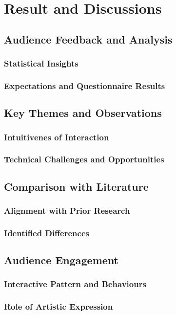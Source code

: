 \chapter{Result and Discussions}
    \section{Audience Feedback and Analysis}
        \subsection{Statistical Insights}
        \subsection{Expectations and Questionnaire Results}
    \section{Key Themes and Observations}
        \subsection{Intuitivenes of Interaction}
        \subsection{Technical Challenges and Opportunities}
    \section{Comparison with Literature}
        \subsection{Alignment with Prior Research}
        \subsection{Identified Differences}
    \section{Audience Engagement}
        \subsection{Interactive Pattern and Behaviours}
        \subsection{Role of Artistic Expression}
